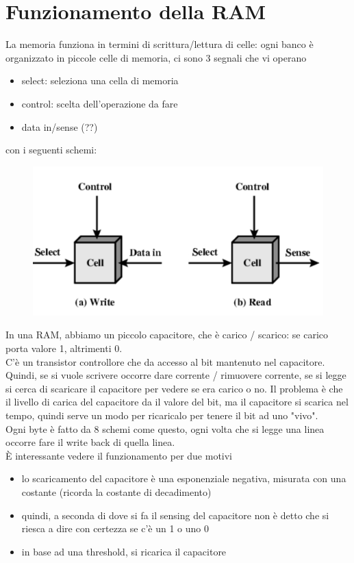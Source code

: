 \documentclass[12pt, oneside]{extbook} %
\begin{document}
\section{Funzionamento della RAM}
La memoria funziona in termini di scrittura/lettura di celle: ogni banco è organizzato in piccole celle di memoria, ci sono 3 segnali che vi operano
\begin{itemize}
\item select: seleziona una cella di memoria
\item control: scelta dell'operazione da fare
\item data in/sense (??)
\end{itemize}
con i seguenti schemi:\\
\begin{figure}[!h]
	\includegraphics[scale=0.4]{immagini/accesso_cella_memoria.png}
\end{figure}
In una RAM, abbiamo un piccolo capacitore, che è carico / scarico: se carico porta valore 1, altrimenti 0.\\C'è un transistor controllore che da accesso al bit mantenuto nel capacitore. Quindi, se si vuole scrivere occorre dare corrente / rimuovere corrente, se si legge si cerca di scaricare il capacitore per vedere se era carico o no. Il problema è che il livello di carica del capacitore da il valore del bit, ma il capacitore si scarica nel tempo, quindi serve un modo per ricaricalo per tenere il bit ad uno "vivo".\\ Ogni byte è fatto da 8 schemi come questo, ogni volta che si legge una linea occorre fare il write back di quella linea.\\ È interessante vedere il funzionamento per due motivi
\begin{itemize}
\item lo scaricamento del capacitore è una esponenziale negativa, misurata con una costante (ricorda la costante di decadimento)
\item quindi, a seconda di dove si fa il sensing del capacitore non è detto che si riesca a dire con certezza se c'è un 1 o uno 0
\item in base ad una threshold, si ricarica il capacitore
\end{itemize}
\end{document}
